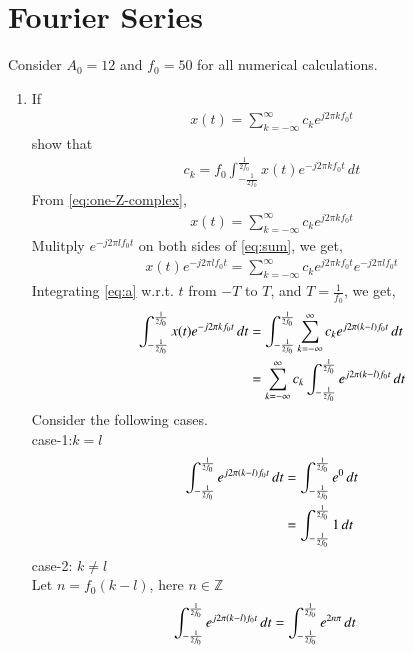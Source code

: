 \documentclass[journal,12pt,twocolumn]{IEEEtran}
\renewcommand\thesection{\arabic{section}}
\begin{document}
    \section{Fourier Series}
    Consider $A_0 =12$ and $f_0 = 50$ for all numerical calculations.
    \begin{enumerate}[label=\thesection.\arabic*,ref=\thesection.\theenumi]
    \item If
    \begin{align}
        x(t) = \sum_{k = -\infty}^{\infty}c_ke^{j2\pi kf_0 t}
    \label{eq:one-Z-complex}
    \end{align}
    show that 
    \begin{align}
        c_k = f_0\int_{-\frac{1}{2f_0}}^{\frac{1}{2f_0}}x(t)e^{-j2\pi kf_0 t}\, dt
    \label{eq:one-Z}
    \end{align}
    \solution 
    From \eqref{eq:one-Z-complex},
    \begin{align}
    	\label{eq:sum}
            x(t) = \sum_{k = -\infty}^{\infty}c_ke^{j2\pi kf_0 t}
    \end{align}
    Mulitply $e^{-j2\pi lf_0 t}$ on both sides of \eqref{eq:sum}, we get,
    \begin{align}
    	\label{eq:a}
    x(t)e^{-j2\pi lf_0 t}=\sum_{k = -\infty}^{\infty}c_ke^{j2\pi kf_0 t}e^{-j2\pi lf_0 t}
    \end{align}
    Integrating \eqref{eq:a} w.r.t. $t$ from $-T$ to $T$, and $T=\frac{1}{f_0}$, we get,\\
    \begin{align}
    	\label{eq:d}
    \int_{-\frac{1}{2f_0}}^{\frac{1}{2f_0}}x(t)e^{-j2\pi kf_0 t}\, dt&=\int_{-\frac{1}{2f_0}}^{\frac{1}{2f_0}}\sum_{k = -\infty}^{\infty}c_ke^{j2\pi \left(k-l\right)f_0 t}\,dt\\
    &=\sum_{k = -\infty}^{\infty}c_k\int_{-\frac{1}{2f_0}}^{\frac{1}{2f_0}}e^{j2\pi \left(k-l\right)f_0 t}\,dt
    \end{align}
Consider the following cases.\\
case-1:$k=l$
\begin{align}
	\int_{-\frac{1}{2f_0}}^{\frac{1}{2f_0}}e^{j2\pi \left(k-l\right)f_0 t}\,dt&=\int_{-\frac{1}{2f_0}}^{\frac{1}{2f_0}}e^{0}\,dt\\
	&=\int_{-\frac{1}{2f_0}}^{\frac{1}{2f_0}} 1 \,dt
\end{align}
case-2: $k \neq l$ \\
Let $n=f_0(k-l)$, here $n \in \mathbb{Z}$
\begin{align}
	\label{eq:b}
\int_{-\frac{1}{2f_0}}^{\frac{1}{2f_0}}e^{j2\pi \brak{k-l}f_0 t}\,dt&=\int_{-\frac{1}{2f_0}}^{\frac{1}{2f_0}}e^{2n\pi}\,dt	

\end{align}
\end{enumerate}
\end{document}

